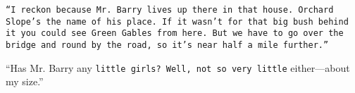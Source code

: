 \documentclass[a4paper]{article}
\begin{document}
\texttt{``I reckon because Mr. Barry lives up there in that house. \textrm{Orchard Slope's the name of his place. }\textsf{If it wasn't for that big bush behind it you could see Green Gables from here.} But we have to go over the bridge and round by the road, so it's near half a mile further.''}

``Has \textsf{Mr. Barry any \texttt{little girls? Well, \textrm{not so} very little} either---about my} size.''
\end{document}

